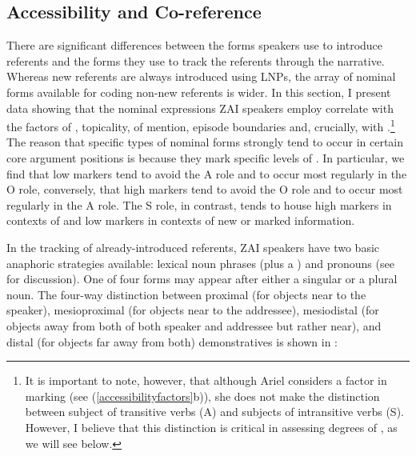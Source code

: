 \subsection{Accessibility and Co-reference}

There are significant differences between the forms speakers use to introduce referents and the forms they use to track the referents through the narrative. Whereas new referents are always introduced using LNPs, the array of nominal forms available for coding non-new referents is wider. In this section, I present data showing that the nominal expressions ZAI speakers employ correlate with the  factors of , topicality,  of mention, episode boundaries and, crucially, with .\footnote{It is important to note, however, that although Ariel considers  a factor in  marking (see (\ref{accessibilityfactors}b)), she does not make the distinction between subject of transitive verbs (A) and subjects of intransitive verbs (S). However, I believe that this distinction is critical in assessing degrees of , as we will see below.} The reason that specific types of nominal forms strongly tend to occur in certain core argument positions is because they mark specific levels of . In particular, we find that low  markers tend to avoid the A role and to occur most regularly in the O role, conversely, that high  markers tend to avoid the O role and to occur most regularly in the A role. The S role, in contrast, tends to house high  markers in contexts of  and low  markers in contexts of new or marked information.


In the tracking of already-introduced referents, ZAI speakers have two basic anaphoric strategies available: lexical noun phrases (plus a ) and pronouns (see  for discussion). One of four  forms may appear after either a singular or a plural noun. The four-way distinction between proximal (for objects near to the speaker), mesioproximal (for objects near to the addressee), mesiodistal (for objects away from both of both speaker and addressee but rather near), and distal (for objects far away from both) demonstratives is shown in : 
 
